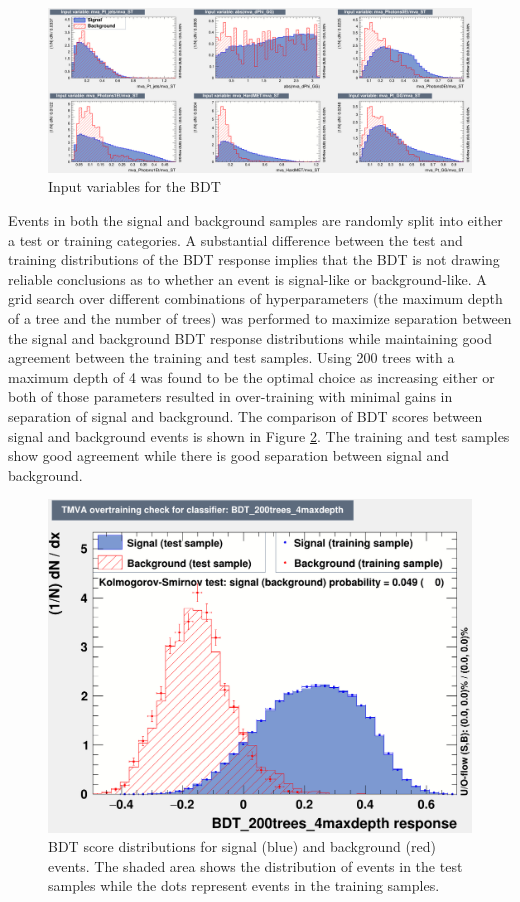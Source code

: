 \begin{figure}[h]
	\centering
	\includegraphics[width=1.7\linewidth, angle=90]{Figures/BDTvar1}
	\caption[BDT input variables]{Input variables for the BDT}
	\label{fig:bdtvar1}
\end{figure}


Events in both the signal and background samples are randomly split into either a test or training categories.  A substantial difference between the test and training distributions of the BDT response implies that the BDT is not drawing reliable conclusions as to whether an event is signal-like or background-like.  A grid search over different combinations of hyperparameters (the maximum depth of a tree and the number of trees) was performed to maximize separation between the signal and background BDT response distributions while maintaining good agreement between the training and test samples.  Using 200 trees with a maximum depth of 4 was found to be the optimal choice as increasing either or both of those parameters resulted in over-training with minimal gains in separation of signal and background. The comparison of BDT scores between signal and background events is shown in Figure \ref{fig:bdtresponse}.  The training and test samples show good agreement while there is good separation between signal and background.

\begin{figure}[h]
	\centering
	\includegraphics[width=1.0\linewidth]{Figures/BDT_response}
	\caption[BDT training and testing results]{BDT score distributions for signal (blue) and background (red) events.  The shaded area shows the distribution of events in the test samples while the dots represent events in the training samples.}
	\label{fig:bdtresponse}
\end{figure}

